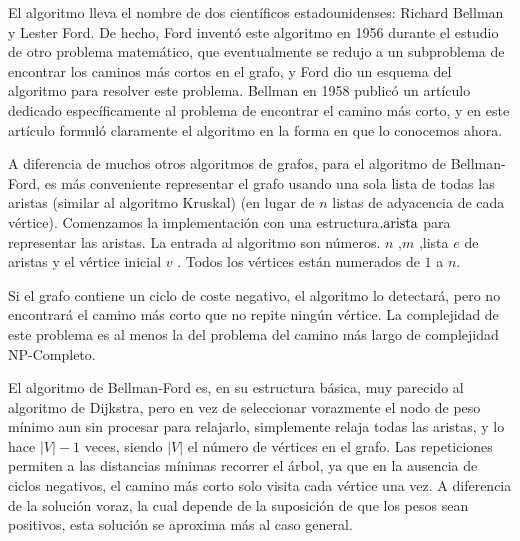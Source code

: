 El algoritmo lleva el nombre de dos científicos estadounidenses: Richard Bellman y Lester Ford. De hecho, Ford inventó este algoritmo en 1956 durante el estudio de otro problema matemático, que eventualmente se redujo a un subproblema de encontrar los caminos más cortos en el grafo, y Ford dio un esquema del algoritmo para resolver este problema. Bellman en 1958 publicó un artículo dedicado específicamente al problema de encontrar el camino más corto, y en este artículo formuló claramente el algoritmo en la forma en que lo conocemos ahora.

A diferencia de muchos otros algoritmos de grafos, para el algoritmo de Bellman-Ford, es más 
conveniente representar el grafo usando una sola lista de todas las aristas (similar al algoritmo 
Kruskal) (en lugar de $n$ listas de adyacencia de cada vértice). Comenzamos la implementación con una 
estructura$\rm.arista$ para representar las aristas. La entrada al algoritmo son números. $n$ ,$m$ 
,lista $e$ de aristas y el vértice inicial $v$ . Todos los vértices están numerados de $1$ a $n$.

Si el grafo contiene un ciclo de coste negativo, el algoritmo lo detectará, pero no encontrará el 
camino más corto que no repite ningún vértice. La complejidad de este problema es al menos la del 
problema del camino más largo de complejidad NP-Completo.

El algoritmo de Bellman-Ford es, en su estructura básica, muy parecido al algoritmo de Dijkstra, 
pero en vez de seleccionar vorazmente el nodo de peso mínimo aun sin procesar para relajarlo, 
simplemente relaja todas las aristas, y lo hace $|V|-1$ veces, siendo $|V|$ el número de vértices en el grafo. Las repeticiones permiten a las distancias mínimas recorrer el árbol, ya que en la 
ausencia de ciclos negativos, el camino más corto solo visita cada vértice una vez. A diferencia 
de la solución voraz, la cual depende de la suposición de que los pesos sean positivos, esta 
solución se aproxima más al caso general.

